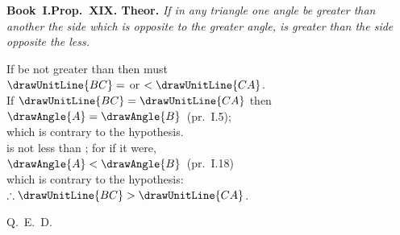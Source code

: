 \documentclass[12pt]{article}\usepackage{geometry}\geometry{a5paper,margin=1.5cm}
\begin{document}
\noindent\begin{minipage}[t]{0.45\linewidth}\centering\vspace{0pt}%
\drawCurrentPicture\end{minipage}\hfill
\begin{minipage}[t]{0.52\linewidth}\vspace{0pt}%
\textbf{Book~I.\enspace Prop.\ XIX. Theor.}
\medskip\noindent\itshape
If in any triangle  one angle 
be greater than another  the side  which is
opposite to the greater angle, is greater than the side 
opposite the less.
\bigskip\noindent\upshape\begin{center}
If  be not greater than  then must\\
$\drawUnitLine{BC}=$ or $<\drawUnitLine{CA}$.\\[6pt]
If $\drawUnitLine{BC}=\drawUnitLine{CA}$ then\\
$\drawAngle{A}=\drawAngle{B}$~(pr.~I.5);\\
which is contrary to the hypothesis.\\[6pt]
 is not less than ; for if it were,\\
$\drawAngle{A}<\drawAngle{B}$~(pr.~I.18)\\
which is contrary to the hypothesis:\\[4pt]
$\therefore \drawUnitLine{BC}>\drawUnitLine{CA}$.
\end{center}
\begin{flushright}Q.\ E.\ D.\end{flushright}
\end{minipage}
\end{document}
